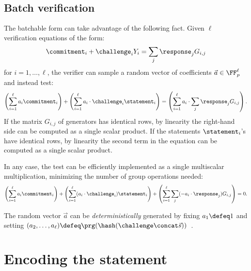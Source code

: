 \documentclass[11pt]{article}
\begin{document}
\subsection{Batch verification}

The batchable form can take advantage of the following fact.
Given $\ell$ verification equations of the form:
\[
   \commitment_i + \challenge_i Y_i = \sum_j \response_j G_{i,j}
\]
for $i=1, \dots,\ell$,
the verifier can sample a random vector of coefficients $\vec a \in \FF_p^\ell$ and instead test:
\[
  \left(\sum_{i=1}^{\ell} a_i \commitment_i\right) + \left(\sum_{i=1}^{\ell} a_i \cdot  \challenge_i \statement_i \right) = \left(\sum_{i=1}^{\ell} a_i \cdot \sum_j \response_j G_{i,j}\right).
\]
If the matrix $G_{i, j}$ of generators has identical rows, by linearity the right-hand side can be computed as a single scalar product.
If the statements $\statement_i$'s have identical rows, by linearity the second term in the equation can be computed as a single scalar product.

In any case, the test can be efficiently implemented as a single multiscalar multiplication, minimizing the number of group operations needed:
\[
  \left(\sum_{i=1}^{\ell} a_i \commitment_i\right) + \left(\sum_{i=1}^{\ell} (a_i \cdot  \challenge_i) \statement_i \right) + \left(\sum_{i=1}^{\ell}\sum_j (-a_i \cdot  \response_j) G_{i,j}\right) = 0.
\]

The random vector $\vec a$ can be \emph{deterministically} generated by fixing $a_1 \defeq 1$ and setting $(a_2, \dots, a_{\ell}) \defeq \prg(\hash(\challenge \concat \vec s))$~\cite{bip-schnorr}.

\section{Encoding the statement}
\end{document}
